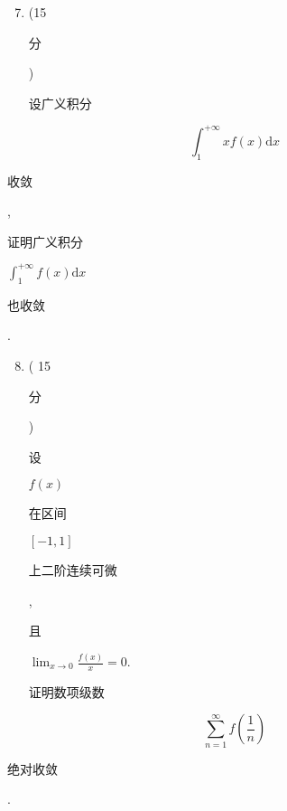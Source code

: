 \documentclass[10pt]{article}
\begin{document}
\begin{enumerate}
  \setcounter{enumi}{6}
  \item (15 \begin{CJK}{UTF8}{mj}分\end{CJK}) \begin{CJK}{UTF8}{mj}设广义积分\end{CJK}
\end{enumerate}
$$
\int_{1}^{+\infty} x f(x) \mathrm{d} x
$$
\begin{CJK}{UTF8}{mj}收敛\end{CJK}, \begin{CJK}{UTF8}{mj}证明广义积分\end{CJK} $\int_{1}^{+\infty} f(x) \mathrm{d} x$ \begin{CJK}{UTF8}{mj}也收敛\end{CJK}.

\begin{enumerate}
  \setcounter{enumi}{7}
  \item ( 15 \begin{CJK}{UTF8}{mj}分\end{CJK}) \begin{CJK}{UTF8}{mj}设\end{CJK} $f(x)$ \begin{CJK}{UTF8}{mj}在区间\end{CJK} $[-1,1]$ \begin{CJK}{UTF8}{mj}上二阶连续可微\end{CJK}, \begin{CJK}{UTF8}{mj}且\end{CJK} $\lim _{x \rightarrow 0} \frac{f(x)}{x}=0$. \begin{CJK}{UTF8}{mj}证明数项级数\end{CJK}
\end{enumerate}
$$
\sum_{n=1}^{\infty} f\left(\frac{1}{n}\right)
$$
\begin{CJK}{UTF8}{mj}绝对收敛\end{CJK}.
\end{document}
